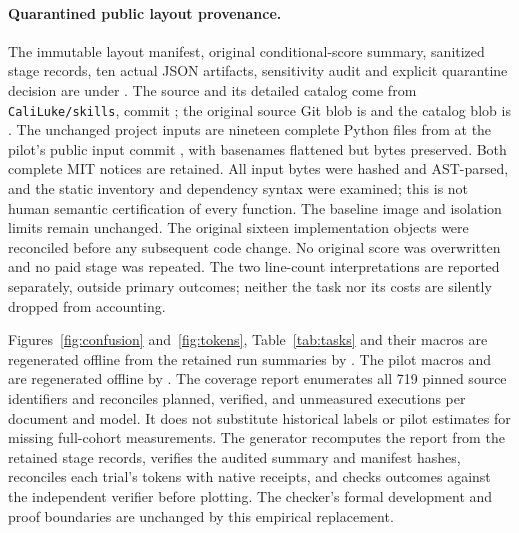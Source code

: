 \documentclass{article}
\theoremstyle{plain}
\theoremstyle{definition}
\newcommand{\id}[1]{\texttt{#1}}
\begin{document}
\paragraph{Quarantined public layout provenance.}
The immutable layout manifest, original conditional-score summary, sanitized
stage records, ten actual JSON artifacts, sensitivity audit and explicit
quarantine decision are under
.
The source and its detailed catalog come from \id{CaliLuke/skills}, commit
; the original source Git blob is
 and the catalog blob is
.
The unchanged project inputs are nineteen complete Python files from
 at the pilot's public input commit
, with basenames flattened
but bytes preserved. Both complete MIT notices are retained. All input bytes
were hashed and AST-parsed, and the static inventory and dependency syntax
were examined; this is not human semantic certification of every function.
The baseline image and isolation limits remain unchanged. The original
sixteen implementation objects were reconciled before any subsequent code
change. No original score was overwritten and no paid stage was repeated.
The two line-count interpretations are reported separately, outside primary
outcomes; neither the task nor its costs are silently dropped from accounting.

Figures~\ref{fig:confusion} and~\ref{fig:tokens}, Table~\ref{tab:tasks} and
their macros are regenerated offline from the retained run summaries by
. The pilot macros and
 are regenerated
offline by .
The coverage report enumerates all 719 pinned source identifiers and
reconciles planned, verified, and unmeasured executions per document and
model. It does not substitute historical labels or pilot estimates for
missing full-cohort measurements. The generator recomputes the
report from the retained stage records, verifies the audited summary and
manifest hashes, reconciles each trial's tokens with native receipts,
and checks outcomes against the independent verifier before plotting.
The checker's formal development and proof boundaries are unchanged by
this empirical replacement.
\end{document}
